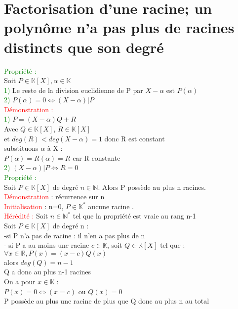 \documentclass{article}
\begin{document}
\section{Factorisation d'une racine; un polynôme n'a pas plus de racines distincts que son degré}
\textcolor{green}{Propriété :} \\ 
Soit $P \in \mathbb{K}[X], \alpha \in \mathbb K$ \\
\textcolor{green}{1)} Le reste de la division euclidienne de P par $X-\alpha$ est $P(\alpha)$ \\ 
\textcolor{green}{2)} $P(\alpha)= 0 \Longleftrightarrow (X- \alpha)|P$ \\ 
\textcolor{red}{Démonstration :} \\ 
\textcolor{green}{1)} $P=(X-\alpha)Q + R$ \\ 
Avec $Q \in \mathbb K [X]$, $R \in \mathbb K [X]$ \\ 
et $deg(R)< deg(X- \alpha) = 1$ donc R est constant \\ 
substituons $\alpha$ à X : \\ 
$P(\alpha)=R(\alpha)=R$ car R constante \\ 
\textcolor{green}{2)} $(X- \alpha)|P \Longleftrightarrow R=0$ \\ 
\textcolor{green}{Propriété :} \\
	Soit $P \in \mathbb{K}[X]$ de degré $n \in \mathbb{N}$. Alors P possède au plus n racines. \\
	\textcolor{red}{Démonstration} : récurrence sur n \\
	\textcolor{red}{Initialisation} : n=0, $P \in \mathbb{K}^*$ aucune racine . \\
	\textcolor{red}{Hérédité :} Soit $ n \in \mathbb{N}^*$ tel que la propriété est vraie au rang n-1 \\
	Soit $ P \in \mathbb{K}[X]$ de degré n : \\
	-si P n'a pas de racine : il n'en a pas plus de n\\
	- si P a au moins une racine $c \in \mathbb{K}$,
		soit $Q \in \mathbb{K}[X]$ tel que : \\
		$\forall x \in \mathbb{R}, P(x)=(x-c)Q(x)$ \\
		alors $deg(Q)=n-1$ \\
			Q a donc au plus n-1 racines \\
			On a pour $x \in \mathbb{K}$ : \\
				$P(x)=0 \Leftrightarrow (x=c)$ ou $Q(x)=0$ \\
			P possède au plus une racine de plus que Q donc au plus n au total
\end{document}
